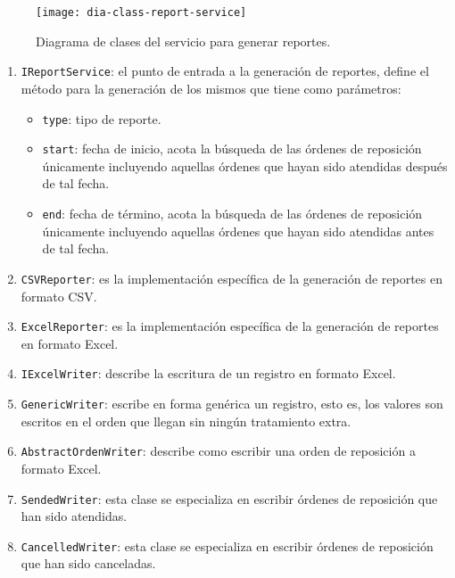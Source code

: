 \begin{figure}[h]
	\centering
	\texttt{[image: dia-class-report-service]}
	\caption{Diagrama de clases del servicio para generar reportes.}
	\label{fig:dia-class-report-service}
\end{figure}

\begin{enumerate}
	\item \texttt{IReportService}: el punto de entrada a la generación de reportes, define el método para la generación de los mismos que tiene como parámetros:
	\begin{itemize}
	 	\item \texttt{type}: tipo de reporte.
	 	\item \texttt{start}: fecha de inicio, acota la búsqueda de las órdenes de reposición únicamente incluyendo aquellas órdenes que hayan sido atendidas después de tal fecha.
	 	\item \texttt{end}: fecha de término, acota la búsqueda de las órdenes de reposición únicamente incluyendo aquellas órdenes que hayan sido atendidas antes de tal fecha.
	 \end{itemize}
	\item \texttt{CSVReporter}: es la implementación específica de la generación de reportes en formato CSV.
	\item \texttt{ExcelReporter}: es la implementación específica de la generación de reportes en formato Excel\textsuperscript{\textcopyright}.
	\item \texttt{IExcelWriter}: describe la escritura de un registro en formato Excel\textsuperscript{\textcopyright}.
	\item \texttt{GenericWriter}: escribe en forma genérica un registro, esto es, los valores son escritos en el orden que llegan sin ningún tratamiento extra. 
	\item \texttt{AbstractOrdenWriter}: describe como escribir una orden de reposición a formato Excel\textsuperscript{\textcopyright}.
	\item \texttt{SendedWriter}: esta clase se especializa en escribir órdenes de reposición que han sido atendidas.
	\item \texttt{CancelledWriter}: esta clase se especializa en escribir órdenes de reposición que han sido canceladas.
\end{enumerate}



